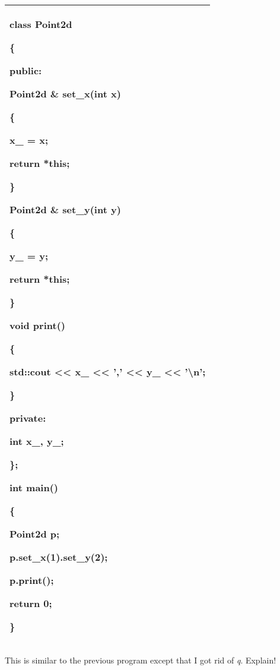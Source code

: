 \documentclass[
]{article}
\begin{document}
\begin{longtable}[]{@{}l@{}}
\toprule
\endhead
\begin{minipage}[t]{0.97\columnwidth}\raggedright
class Point2d

\{

public:

Point2d \textbf{\&} set\_x(int x)

\{

x\_ = x;

return \textbf{*this};

\}

Point2d \textbf{\&} set\_y(int y)

\{

y\_ = y;

return \textbf{*this};

\}

void print()

\{

std::cout \textless\textless{} x\_ \textless\textless{} ','
\textless\textless{} y\_ \textless\textless{} '\textbackslash n';

\}

private:

int x\_, y\_;

\};

int main()

\{

Point2d p;

p.set\_x(1).set\_y(2);

p.print();

return 0;

\}\strut
\end{minipage}\tabularnewline
\bottomrule
\end{longtable}

This is similar to the previous program except that I got rid of
\emph{q}. Explain!
\end{document}
